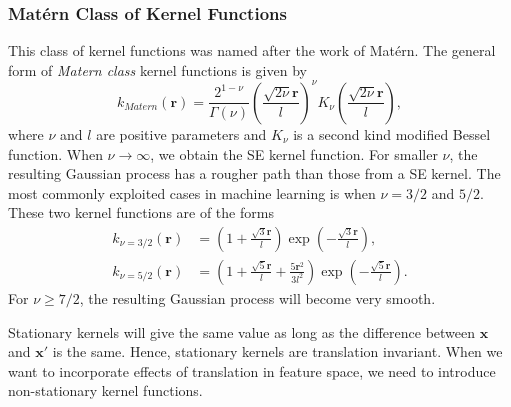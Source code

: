\documentclass[11pt,a4paper]{article}
\theoremstyle{definition}
\numberwithin{equation}{section}
\let\vec\mathbf
\begin{document}
	\subsubsection*{Mat\'ern Class of Kernel Functions}
	This class of kernel functions was named after the work of Mat\'ern. The general form of \textit{Matern class} kernel functions is given by
	\begin{equation}
	k_{Matern}(\vec r) = \frac{2^{1-\nu}}{\Gamma{(\nu)}}\left(\frac{\sqrt{2\nu}\vec r}{l}\right)^\nu K_\nu \left(\frac{\sqrt{2\nu}\vec r}{l}\right),
	\end{equation}
	where $\nu$ and $l$ are positive parameters and $K_\nu$ is a second kind modified Bessel function\cite[Abramowitz and Stegun]{Ab_St}. When $\nu \rightarrow \infty$, we obtain the SE kernel function. For smaller $\nu$, the resulting Gaussian process has a rougher path than those from a SE kernel. The most commonly exploited cases in machine learning is when $\nu = 3/2$ and $ 5/2$\cite[Rasmussen and Williams, sec 4.2]{RandW}. These two kernel functions are of the forms
	\begin{equation}
	\begin{split}
	k_{\nu = 3/2}(\vec r) &=\left(1+\frac{\sqrt{3}\vec r}{l}\right)\exp\left(-\frac{\sqrt{3}\vec r}{l}\right),\\
	k_{\nu = 5/2}(\vec r) &=\left(1+\frac{\sqrt{5}\vec r}{l}+\frac{5\vec r^2}{3l^2}\right)\exp\left(-\frac{\sqrt{5}\vec r}{l}\right).
	\end{split}
	\end{equation}
	For $\nu\geq 7/2$, the resulting Gaussian process will become very smooth\cite[Rasmussen and Williams, sec 4.2]{RandW}.
	
	Stationary kernels will give the same value as long as the difference between $\vec x$ and $\vec x'$ is the same. Hence, stationary kernels are translation invariant. When we want to incorporate effects of translation in feature space, we need to introduce non-stationary kernel functions.
	
\end{document}
